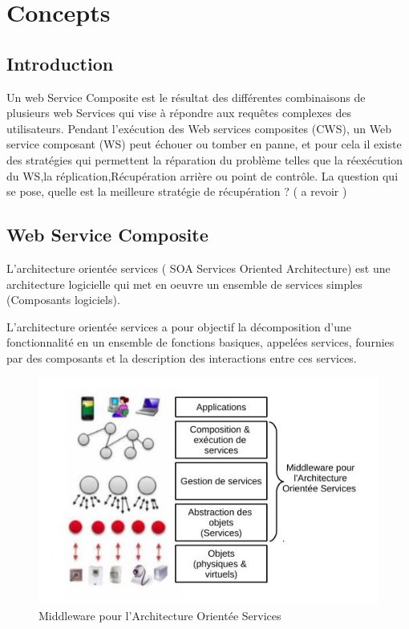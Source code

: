 
\vspace{1cm}

\section{Concepts}

\subsection{Introduction}

Un web Service Composite est  le résultat des différentes combinaisons de plusieurs web Services qui vise à répondre aux requêtes complexes des utilisateurs.
Pendant l'exécution des Web services composites (CWS), un Web service composant (WS) peut échouer ou tomber en panne, et pour cela il existe des stratégies qui permettent la réparation du problème telles que  la réexécution du WS,la réplication,Récupération arrière ou point de contrôle.
La question qui se pose, quelle est la meilleure stratégie de récupération ? 
( a revoir ) 

\subsection{Web Service Composite}

L'architecture orientée services ( SOA Services Oriented Architecture) est une architecture logicielle qui met en oeuvre un ensemble de services simples (Composants logiciels).

L'architecture orientée services a pour objectif la décomposition d'une fonctionnalité en un ensemble de fonctions basiques, appelées services, fournies par des composants et la description des interactions entre ces services.


\begin{figure}[H]
\begin{center}
\includegraphics[width=1\linewidth]{images/Middleware SOA.jpg}
\end{center}
\caption{Middleware pour l’Architecture Orientée Services}
\label{fig:1}
\end{figure}

